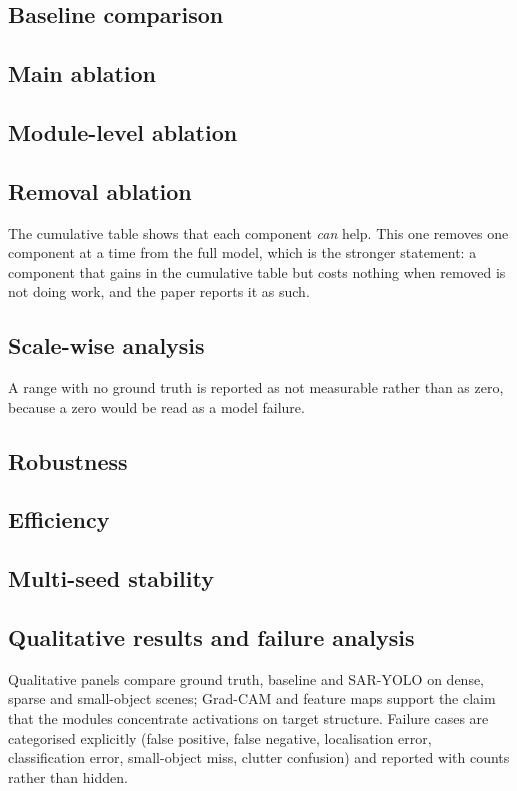 \documentclass[10pt,twocolumn,letterpaper]{article}
\newcommand{\ours}{\textsc{SAR-YOLO}}
\begin{document}
\subsection{Baseline comparison}


\subsection{Main ablation}
\label{sec:ablation}


\subsection{Module-level ablation}


\subsection{Removal ablation}

The cumulative table shows that each component \emph{can} help. This one removes
one component at a time from the full model, which is the stronger statement: a
component that gains in the cumulative table but costs nothing when removed is
not doing work, and the paper reports it as such.

\subsection{Scale-wise analysis}

A range with no ground truth is reported as not measurable rather than as zero,
because a zero would be read as a model failure.

\subsection{Robustness}


\subsection{Efficiency}


\subsection{Multi-seed stability}


\subsection{Qualitative results and failure analysis}
Qualitative panels compare ground truth, baseline and \ours{} on dense, sparse
and small-object scenes; Grad-CAM and feature maps support the claim that the
modules concentrate activations on target structure. Failure cases are
categorised explicitly (false positive, false negative, localisation error,
classification error, small-object miss, clutter confusion) and reported with
counts rather than hidden.
\end{document}
